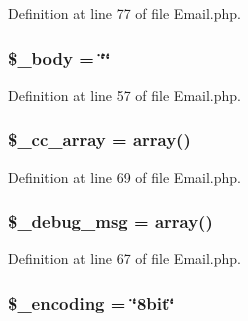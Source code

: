 Definition at line 77 of file Email.\-php.

\hypertarget{class_c_i___email_a2428d6733045fa7c07e5f61c8c85b8c9}{
\subsubsection[{\$\-\_\-body}]{\setlength{\rightskip}{0pt plus 5cm}\$\-\_\-body = \char`\"{}\char`\"{}}}\label{class_c_i___email_a2428d6733045fa7c07e5f61c8c85b8c9}


Definition at line 57 of file Email.\-php.

\hypertarget{class_c_i___email_af979b4b8dc11cd847482938c13fd527d}{
\subsubsection[{\$\-\_\-cc\-\_\-array}]{\setlength{\rightskip}{0pt plus 5cm}\$\-\_\-cc\-\_\-array = array()}}\label{class_c_i___email_af979b4b8dc11cd847482938c13fd527d}


Definition at line 69 of file Email.\-php.

\hypertarget{class_c_i___email_a23c65b604c773811f76e75093fe9a77b}{
\subsubsection[{\$\-\_\-debug\-\_\-msg}]{\setlength{\rightskip}{0pt plus 5cm}\$\-\_\-debug\-\_\-msg = array()}}\label{class_c_i___email_a23c65b604c773811f76e75093fe9a77b}


Definition at line 67 of file Email.\-php.

\hypertarget{class_c_i___email_a37d569dfb47810a72ca1cfc5095ad149}{
\subsubsection[{\$\-\_\-encoding}]{\setlength{\rightskip}{0pt plus 5cm}\$\-\_\-encoding = \char`\"{}8bit\char`\"{}}}\label{class_c_i___email_a37d569dfb47810a72ca1cfc5095ad149}


